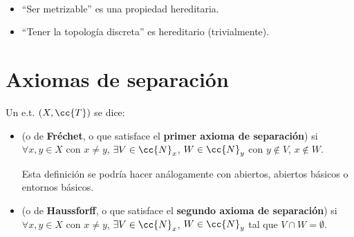 \begin{ejemplo}\
    \begin{itemize}
        \item ``Ser metrizable'' es una propiedad hereditaria.
        \item ``Tener la topología discreta'' es hereditario (trivialmente).
    \end{itemize}
    \endsquare
\end{ejemplo}

\section{Axiomas de separación}

\begin{definicion}
    Un e.t. $(X, \cc{T})$ se dice:
    \begin{itemize}
        \item {} (o de \textbf{Fréchet}, o que satisface el \textbf{primer axioma de separación}) si $\forall x,y \in X$ con $x\neq y$, $\exists V \in \cc{N}_x$, $W\in \cc{N}_y$ con $y\notin V$, $x\notin W$.
        
        \begin{center}
        \end{center}

        Esta definición se podría hacer análogamente con abiertos, abiertos básicos o entornos básicos.

        \item {} (o de \textbf{Haussforff}, o que satisface el \textbf{segundo axioma de separación}) si $\forall x,y \in X$ con $x\neq y$, $\exists V \in \cc{N}_x$, $W\in \cc{N}_y$ tal que $V\cap W = \emptyset$.
        

\end{itemize}
\end{definicion}

